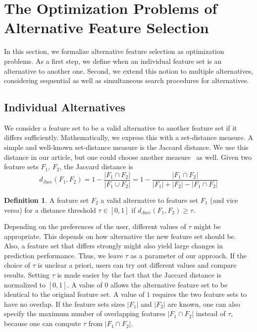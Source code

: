 \documentclass{article}
\theoremstyle{definition}
\newtheorem{definition}{Definition}
\begin{document}
\section{The Optimization Problems of Alternative Feature Selection}
\label{sec:problems}

In this section, we formalize alternative feature selection as optimization problems.
As a first step, we define when an individual feature set is an alternative to another one.
Second, we extend this notion to multiple alternatives, considering sequential as well as simultaneous search procedures for alternatives.

\subsection{Individual Alternatives}

We consider a feature set to be a valid alternative to another feature set if it differs sufficiently.
Mathematically, we express this with a set-distance measure.
A simple and well-known set-distance measure is the Jaccard distance.
We use this distance in our article, but one could choose another measure~\cite{egghe2009new} as well.
Given two feature sets $F_1$, $F_2$, the Jaccard distance is
%
\begin{equation}
	d_{Jacc}(F_1,F_2) = 1 - \frac{|F_1 \cap F_2|}{|F_1 \cup F_2|} = 1 - \frac{|F_1 \cap F_2|}{|F_1| + |F_2| - |F_1 \cap F_2|}
\end{equation}
%
\begin{definition}
	A feature set $F_2$ a valid alternative to feature set $F_1$ (and vice versa) for a distance threshold $\tau \in [0,1]$ if $d_{Jacc}(F_1,F_2) \geq \tau$.
\end{definition}
%
Depending on the preferences of the user, different values of $\tau$ might be appropriate.
This depends on how alternative the new feature set should be.
Also, a feature set that differs strongly might also yield large changes in prediction performance.
Thus, we leave $\tau$ as a parameter of our approach.
If the choice of $\tau$ is unclear a priori, users can try out different values and compare results.
Setting $\tau$ is made easier by the fact that the Jaccard distance is normalized to $[0,1]$.
A value of $0$ allows the alternative feature set to be identical to the original feature set.
A value of $1$ requires the two feature sets to have no overlap.
If the feature sets sizes $|F_1|$ and $|F_2|$ are known, one can also specify the maximum number of overlapping features $|F_1 \cap F_2|$ instead of $\tau$, because one can compute $\tau$ from $|F_1 \cap F_2|$.
\end{document}
